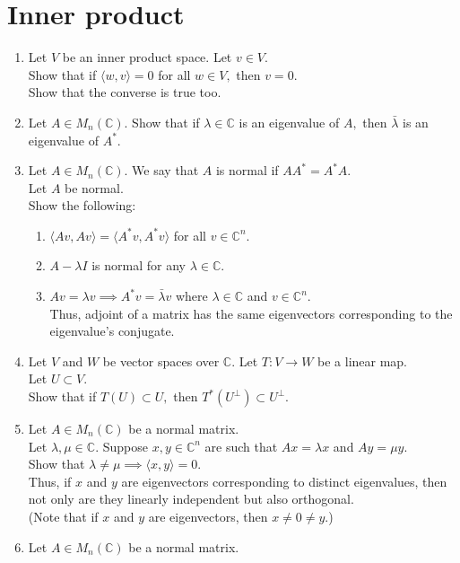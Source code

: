 \documentclass[12pt]{article}
\begin{document}
\section{Inner product}
\begin{enumerate} 
	\item Let $V$ be an inner product space. Let $v \in V.$\\
	Show that if $\langle w, v\rangle = 0$ for all $w \in V,$ then $v = 0.$\\
	Show that the converse is true too.
	\item Let $A \in M_n(\mathbb{C}).$ Show that if $\lambda \in \mathbb{C}$ is an eigenvalue of $A,$ then $\bar{\lambda}$ is an eigenvalue of $A^*.$
	\item Let $A \in M_n(\mathbb{C}).$ We say that $A$ is normal if $AA^* = A^*A.$\\
	Let $A$ be normal.\\
	Show the following:
	\begin{enumerate} 
		\item $\langle Av, Av\rangle = \langle A^*v, A^*v\rangle$ for all $v \in \mathbb{C}^n.$
		\item $A - \lambda I$ is normal for any $\lambda \in \mathbb{C}.$
		\item $Av = \lambda v \implies A^*v = \bar{\lambda} v$ where $\lambda \in \mathbb{C}$ and $v \in \mathbb{C}^n.$\\
		Thus, adjoint of a matrix has the same eigenvectors corresponding to the eigenvalue's conjugate.
	\end{enumerate}
	\item Let $V$ and $W$ be vector spaces over $\mathbb{C}.$ Let $T:V\to W$ be a linear map.\\
	Let $U \subset V.$\\
	Show that if $T(U) \subset U,$ then $T^*(U^\perp) \subset U^\perp.$
	\item Let $A \in M_n(\mathbb{C})$ be a normal matrix.\\
	Let $\lambda, \mu \in \mathbb{C}.$ Suppose $x, y \in \mathbb{C}^n$ are such that $Ax = \lambda x$ and $Ay = \mu y.$\\
	Show that $\lambda \neq \mu \implies \langle x, y\rangle = 0.$\\
	Thus, if $x$ and $y$ are eigenvectors corresponding to distinct eigenvalues, then not only are they linearly independent but also orthogonal.\\
	(Note that if $x$ and $y$ are eigenvectors, then $x \neq 0 \neq y.$)
	\item Let $A \in M_n(\mathbb{C})$ be a normal matrix.\\

\end{enumerate}
\end{document}
